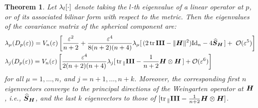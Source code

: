 \documentclass[letterpaper, reqno, 11pt]{amsart}
\newtheorem{theorem}{Theorem}[section]
\theoremstyle{definition}
\theoremstyle{remark}
\numberwithin{equation}{section}
\begin{document}
\begin{theorem}\label{MainTh2}
	 Let $\lambda_l[\cdot]$ denote taking the $l$-th eigenvalue of a linear operator at $p$, or of its associated bilinar form with respect to the metric. Then the eigenvalues of the covariance matrix of the spherical component are:
\begin{align}
		&  \lambda_\mu (D_p(\varepsilon)) =V_n(\varepsilon)\left[\frac{\varepsilon^2}{n+2}+\frac{\varepsilon^4}{8(n+2)(n+4)}\lambda_\mu[\, (2\,\mathrm{tr}\,\boldsymbol{\mathrm{III}} -\|\boldsymbol{H}\|^2)\mathrm{Id}_n -4\boldsymbol{\widehat{S}}_{\boldsymbol{H}} \,] +\;{\mathcal O}(\varepsilon^5)\right] \\
& \lambda_j (D_p(\varepsilon)) =V_n(\varepsilon)\left[\frac{\varepsilon^4}{2(n+2)(n+4)} \lambda_j[\,\mathrm{tr}\,_\parallel\boldsymbol{\mathrm{III}} -\frac{1}{n+2}\boldsymbol{H}\otimes\boldsymbol{H}\,] +{\mathcal O}(\varepsilon^6)\right]
\end{align}
for all $\mu=1,\dots, n$, and $j=n+1,\dots, n+k$. Moreover, the corresponding first $n$ eigenvectors converge to the principal directions of the Weingarten operator at $\boldsymbol{H}$, i.e., $\boldsymbol{\widehat{S}}_{\boldsymbol{H}}$, and the last $k$ eigenvectors to those of $[\mathrm{tr}\,_\parallel\boldsymbol{\mathrm{III}} -\frac{1}{n+2}\boldsymbol{H}\otimes\boldsymbol{H}]$.
\end{theorem}
\end{document}
